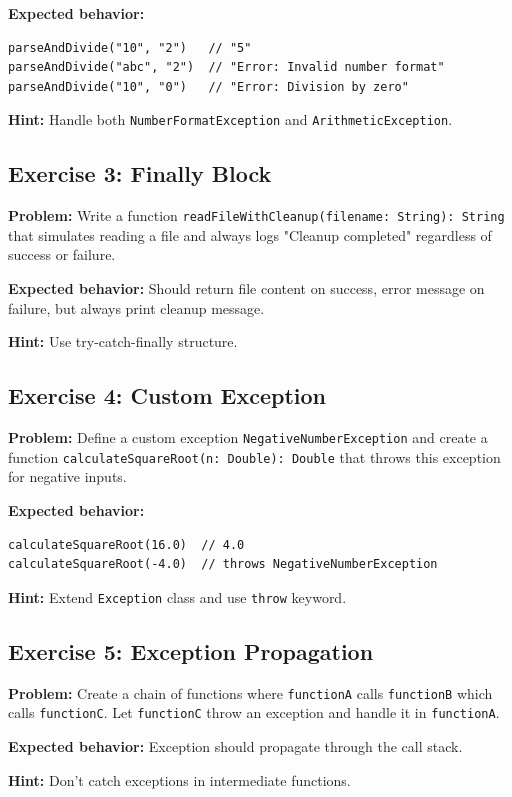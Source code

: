 \documentclass[12pt,a4paper]{article}
\begin{document}
\textbf{Expected behavior:}
\begin{lstlisting}
parseAndDivide("10", "2")   // "5"
parseAndDivide("abc", "2")  // "Error: Invalid number format"
parseAndDivide("10", "0")   // "Error: Division by zero"
\end{lstlisting}

\textbf{Hint:} Handle both \texttt{NumberFormatException} and \texttt{ArithmeticException}.

\subsection{Exercise 3: Finally Block}
\textbf{Problem:} Write a function \texttt{readFileWithCleanup(filename: String): String} that simulates reading a file and always logs "Cleanup completed" regardless of success or failure.

\textbf{Expected behavior:} Should return file content on success, error message on failure, but always print cleanup message.

\textbf{Hint:} Use try-catch-finally structure.

\subsection{Exercise 4: Custom Exception}
\textbf{Problem:} Define a custom exception \texttt{NegativeNumberException} and create a function \texttt{calculateSquareRoot(n: Double): Double} that throws this exception for negative inputs.

\textbf{Expected behavior:}
\begin{lstlisting}
calculateSquareRoot(16.0)  // 4.0
calculateSquareRoot(-4.0)  // throws NegativeNumberException
\end{lstlisting}

\textbf{Hint:} Extend \texttt{Exception} class and use \texttt{throw} keyword.

\subsection{Exercise 5: Exception Propagation}
\textbf{Problem:} Create a chain of functions where \texttt{functionA} calls \texttt{functionB} which calls \texttt{functionC}. Let \texttt{functionC} throw an exception and handle it in \texttt{functionA}.

\textbf{Expected behavior:} Exception should propagate through the call stack.

\textbf{Hint:} Don't catch exceptions in intermediate functions.
\end{document}
